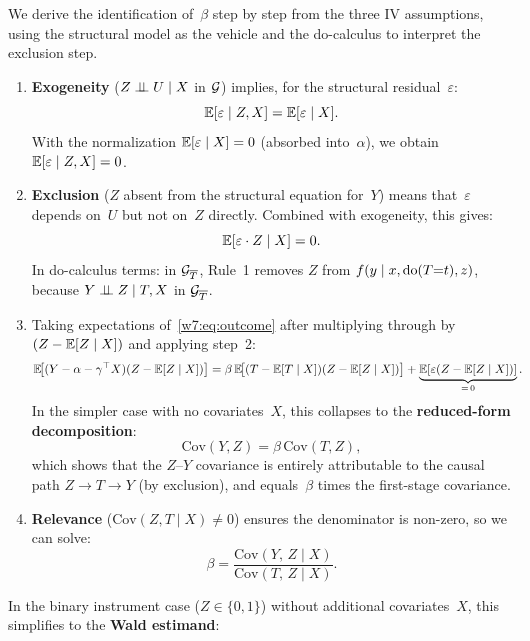\documentclass[master.tex]{subfiles}
\begin{document}
We derive the identification of~$\beta$ step by step from the three
IV assumptions, using the structural model as the vehicle and the
do-calculus to interpret the exclusion step.
\begin{enumerate}
  \item \textbf{Exogeneity} ($Z \perp\!\!\!\perp U \mid X$ in $\mathcal{G}$) implies,
    for the structural residual~$\varepsilon$:
    \[
      \mathbb{E}[\varepsilon \mid Z, X] = \mathbb{E}[\varepsilon \mid X].
    \]
    With the normalization $\mathbb{E}[\varepsilon \mid X] = 0$ (absorbed
    into~$\alpha$), we obtain $\mathbb{E}[\varepsilon \mid Z, X] = 0$.

  \item \textbf{Exclusion} ($Z$ absent from the structural equation
    for~$Y$) means that~$\varepsilon$ depends on~$U$ but not
    on~$Z$ directly.  Combined with exogeneity, this gives:
    \[
      \mathbb{E}[\varepsilon \cdot Z \mid X] = 0.
    \]
    In do-calculus terms: in $\mathcal{G}_{\overline{T}}$, Rule~1 removes
    $Z$ from $f(y \mid x, \mathrm{do}(T{=}t), z)$, because
    $Y \perp\!\!\!\perp Z \mid T, X$ in $\mathcal{G}_{\overline{T}}$.

  \item Taking expectations of~\eqref{w7:eq:outcome} after
    multiplying through by $(Z - \mathbb{E}[Z \mid X])$ and applying
    step~2:
    \begin{align*}
      \mathbb{E}\!\bigl[(Y - \alpha - \gamma^\top X)
               (Z - \mathbb{E}[Z\mid X])\bigr]
      &= \beta\, \mathbb{E}\!\bigl[(T - \mathbb{E}[T\mid X])
                            (Z - \mathbb{E}[Z\mid X])\bigr]
         + \underbrace{\mathbb{E}[\varepsilon (Z - \mathbb{E}[Z\mid X])]}_{=\,0}.
    \end{align*}
    In the simpler case with no covariates~$X$, this collapses to
    the \textbf{reduced-form decomposition}:
    \[
      \mathrm{Cov}(Y, Z) = \beta\, \mathrm{Cov}(T, Z),
    \]
    which shows that the $Z$--$Y$ covariance is entirely
    attributable to the causal path $Z \to T \to Y$ (by
    exclusion), and equals~$\beta$ times the first-stage
    covariance.

  \item \textbf{Relevance} ($\mathrm{Cov}(Z, T \mid X) \neq 0$)
    ensures the denominator is non-zero, so we can solve:
    \[
      \beta
      = \frac{\mathrm{Cov}(Y,\, Z \mid X)}
             {\mathrm{Cov}(T,\, Z \mid X)}.
    \]
\end{enumerate}

In the binary instrument case ($Z \in \{0,1\}$) without additional
covariates~$X$, this simplifies to the \textbf{Wald estimand}:
\end{document}
